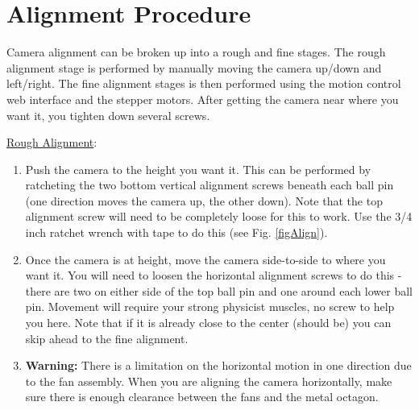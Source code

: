 \documentclass[11pt]{article}
\begin{document}
\section{Alignment Procedure}
\label{alignSec}

Camera alignment can be broken up into a rough and fine stages.
The rough alignment stage is performed by manually moving the camera up/down and left/right.
The fine alignment stages is then performed using the motion control web interface and the stepper motors.
After getting the camera near where you want it, you tighten down several screws.

\underline{Rough Alignment}:
\begin{enumerate}
	\item Push the camera to the height you want it.  
		This can be performed by ratcheting the two bottom vertical alignment screws beneath each ball pin (one direction moves the camera up, the other down).
		Note that the top alignment screw will need to be completely loose for this to work. 
		Use the 3/4 inch ratchet wrench with tape to do this (see Fig. \ref{figAlign}).
	\item Once the camera is at height, move the camera side-to-side to where you want it.
		You will need to loosen the horizontal alignment screws to do this - there are two on either side of the top ball pin and one around each lower ball pin.
		Movement will require your strong physicist muscles, no screw to help you here.
		Note that if it is already close to the center (should be) you can skip ahead to the fine alignment.
	\item {\bf Warning: }  There is a limitation on the horizontal motion in one direction due to the fan assembly.  
		When you are aligning the camera horizontally, make sure there is enough clearance between the fans and the metal octagon.
\end{enumerate}
\end{document}
